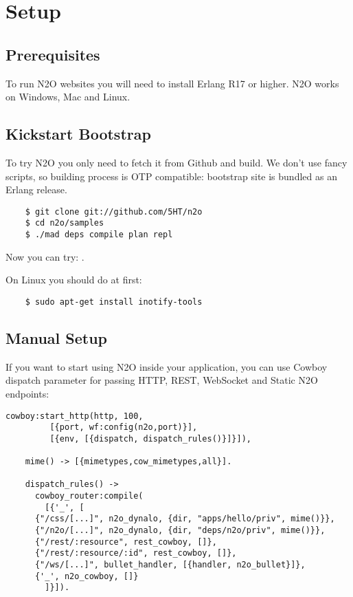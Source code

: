 \section{Setup}

\subsection{Prerequisites}
To run N2O websites you will need to install Erlang R17 or higher.
N2O works on Windows, Mac and Linux.

\subsection{Kickstart Bootstrap}
To try N2O you only need to fetch it from Github and build. We don't use
fancy scripts, so building process is OTP compatible: bootstrap site
is bundled as an Erlang release.

\vspace{1\baselineskip}
\begin{lstlisting}
    $ git clone git://github.com/5HT/n2o
    $ cd n2o/samples
    $ ./mad deps compile plan repl
\end{lstlisting}
\vspace{1\baselineskip}

Now you can try: .

On Linux you should do at first:

\begin{lstlisting}
    $ sudo apt-get install inotify-tools
\end{lstlisting}

\newpage
\subsection{Manual Setup}
If you want to start using N2O inside your application, you can use Cowboy dispatch parameter
for passing HTTP, REST, WebSocket and Static N2O endpoints:

\begin{lstlisting}[caption=web\_sup.erl]
    cowboy:start_http(http, 100,
         [{port, wf:config(n2o,port)}],
         [{env, [{dispatch, dispatch_rules()}]}]),

    mime() -> [{mimetypes,cow_mimetypes,all}].

    dispatch_rules() ->
      cowboy_router:compile(
        [{'_', [
      {"/css/[...]", n2o_dynalo, {dir, "apps/hello/priv", mime()}},
      {"/n2o/[...]", n2o_dynalo, {dir, "deps/n2o/priv", mime()}},
      {"/rest/:resource", rest_cowboy, []},
      {"/rest/:resource/:id", rest_cowboy, []},
      {"/ws/[...]", bullet_handler, [{handler, n2o_bullet}]},
      {'_', n2o_cowboy, []}
        ]}]).
\end{lstlisting}
\vspace{1\baselineskip}

